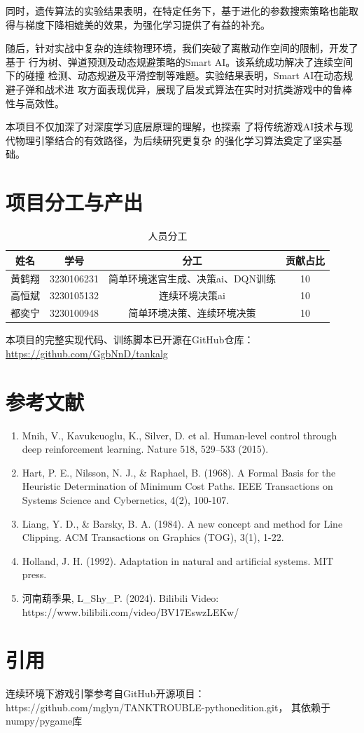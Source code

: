 \documentclass[conference]{IEEEtran}
\begin{document}
同时，遗传算法的实验结果表明，在特定任务下，基于进化的参数搜索策略也能取得与梯度下降相媲美的效果，为强化学习提供了有益的补充。

随后，针对实战中复杂的连续物理环境，我们突破了离散动作空间的限制，开发了基于
行为树、弹道预测及动态规避策略的Smart AI。该系统成功解决了连续空间下的碰撞
检测、动态规避及平滑控制等难题。实验结果表明，Smart AI在动态规避子弹和战术进
攻方面表现优异，展现了启发式算法在实时对抗类游戏中的鲁棒性与高效性。

本项目不仅加深了对深度学习底层原理的理解，也探索
了将传统游戏AI技术与现代物理引擎结合的有效路径，为后续研究更复杂
的强化学习算法奠定了坚实基础。

\section{项目分工与产出}

\begin{table}[htbp]
\centering
\caption{人员分工}
\begin{tabular}{|c|c|c|c|}
\hline
\textbf{姓名} & \textbf{学号} & \textbf{分工}  & \textbf{贡献占比}\\ \hline
黄鹤翔    & 3230106231                   & 简单环境迷宫生成、决策ai、DQN训练    &10            \\ \hline
高恒斌    & 3230105132                  & 连续环境决策ai     &10           \\ \hline
都奕宁    & 3230100948                  & 简单环境决策、连续环境决策        &10      \\ \hline
\end{tabular}
\end{table}
本项目的完整实现代码、训练脚本已开源在GitHub仓库：
\url{https://github.com/GgbNnD/tankalg}


\section{参考文献}
\begin{enumerate}
    \item Mnih, V., Kavukcuoglu, K., Silver, D. et al. Human-level control through deep reinforcement learning. Nature 518, 529–533 (2015).
    \item Hart, P. E., Nilsson, N. J., \& Raphael, B. (1968). A Formal Basis for the Heuristic Determination of Minimum Cost Paths. IEEE Transactions on Systems Science and Cybernetics, 4(2), 100-107.
    \item Liang, Y. D., \& Barsky, B. A. (1984). A new concept and method for Line Clipping. ACM Transactions on Graphics (TOG), 3(1), 1-22.
    \item Holland, J. H. (1992). Adaptation in natural and artificial systems. MIT press.
    \item 河南葫季果, L\_Shy\_P. (2024). Bilibili Video: https://www.bilibili.com/video/BV17EswzLEKw/
\end{enumerate}


\section{引用}
连续环境下游戏引擎参考自GitHub开源项目：https://github.com/mglyn/TANKTROUBLE-pythonedition.git，
其依赖于numpy/pygame库
\end{document}
